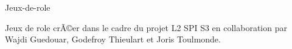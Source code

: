 Jeux-\/de-\/role

Jeux de role crÃ©er dans le cadre du projet L2 S\-P\-I S3 en collaboration par Wajdi Guedouar, Godefroy Thieulart et Joris Toulmonde. 